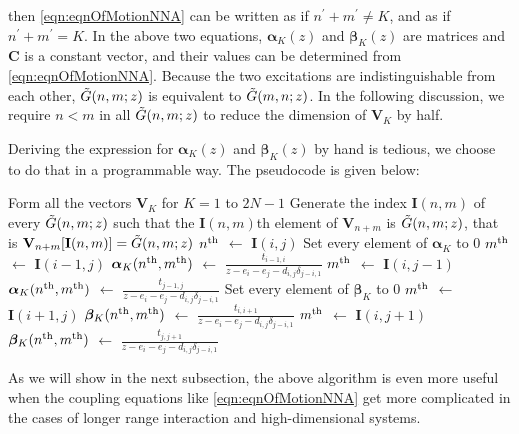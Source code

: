 then \autoref{eqn:eqnOfMotionNNA} can be written as
if $n^{\prime} + m^{\prime} \neq K$, and as
if $n^{\prime} + m^{\prime} = K$. In the above two equations, $\boldsymbol\alpha_{K}(z)$ and
 $\boldsymbol\beta_{K}(z)$
are matrices and $\mathbf{C}$ is a constant vector, and their values can be determined from 
\autoref{eqn:eqnOfMotionNNA}. Because the two excitations are indistinguishable from each other, $\Tilde{G}(n, m; z)$ is equivalent 
to $\Tilde{G}(m, n; z)$. In the following discussion, we require $n<m$ in all $\Tilde{G}(n, m; z)$ to reduce the dimension
 of $\mathbf{V}_{K}$ by half.

 Deriving the expression for $\boldsymbol\alpha_{K}(z)$ and
 $\boldsymbol\beta_{K}(z)$ by hand is tedious, we choose to do that in a programmable way. The 
pseudocode is given below:
\begin{algorithmic}[1]
\State Form all the vectors $\mathbf{V}_{K}$ for $K=1$ to $2N-1$
\State Generate the index $\mathbf{I}(n,m)$ of every $\Tilde{G}(n, m; z)$ such that the $\mathbf{I}(n,m)$th element 
of $\mathbf{V}_{n+m}$ is $\Tilde{G}(n, m; z)$, that is $\mathbf{V}_{n+m}[\mathbf{I}(n,m)] = \Tilde{G}(n, m; z)$
     \State $n^{\rm th}$ $\gets$ $\mathbf{I}(i,j)$
     \State Set every element of $\boldsymbol\alpha_{K}$ to 0
                   \State $m^{\rm th}$ $\gets$ $ \mathbf{I}(i-1, j)$  
                   \State $\boldsymbol\alpha_{K}(n^{\rm th}, m^{\rm th})$ $\gets$ $\frac{t_{i-1, i}}{z - e_{i} - e_{j} -   d_{i, j} \delta_{j-i, 1}}$
       \EndIf
%
                   \State $m^{\rm th}$ $\gets$ $ \mathbf{I}(i, j-1)$  
                   \State $\boldsymbol\alpha_{K}(n^{\rm th}, m^{\rm th})$ $\gets$ $\frac{t_{j-1, j}}{z - e_{i} - e_{j} -   d_{i, j} \delta_{j-i, 1}}$
       \EndIf
        \State Set every element of $\boldsymbol\beta_{K}$ to 0
                   \State $m^{\rm th}$ $\gets$ $ \mathbf{I}(i+1, j)$  
                   \State $\boldsymbol\beta_{K}(n^{\rm th}, m^{\rm th})$ $\gets$ $\frac{t_{i, i+1}}{z - e_{i} - e_{j} -   d_{i, j} \delta_{j-i, 1}}$
       \EndIf
%
                   \State $m^{\rm th}$ $\gets$ $ \mathbf{I}(i, j+1)$  
                   \State $\boldsymbol\beta_{K}(n^{\rm th}, m^{\rm th})$ $\gets$ $\frac{t_{j, j+1}}{z - e_{i} - e_{j} -   d_{i, j} \delta_{j-i, 1}}$
       \EndIf
\EndFor
\end{algorithmic}
As we will show in the next subsection, the above algorithm is even more useful when the coupling equations like
\autoref{eqn:eqnOfMotionNNA} get more complicated in the cases of
 longer range interaction and high-dimensional systems.

